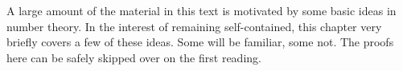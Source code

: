 A large amount of the material in this text is motivated by some basic ideas in number theory. In the interest of remaining self-contained, this chapter very briefly covers a few of these ideas. Some will be familiar, some not. The proofs here can be safely skipped over on the first reading.
